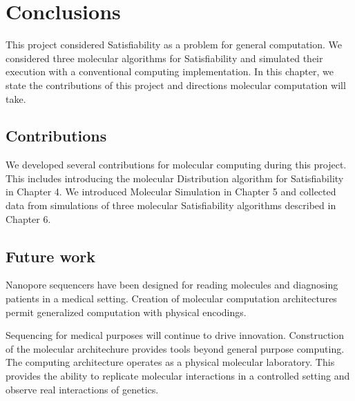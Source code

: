 \chapter{Conclusions}

This project considered {\sc Satisfiability} as a problem for general computation.  We considered three molecular algorithms for {\sc Satisfiability} and simulated their execution with a conventional computing implementation.  In this chapter, we state the contributions of this project and directions molecular computation will take.
	
	\section{Contributions}

We developed several contributions for molecular computing during this project.  This includes introducing the molecular Distribution algorithm for {\sc Satisfiability} in Chapter 4.  We introduced Molecular Simulation in Chapter 5 and collected data from simulations of three molecular {\sc Satisfiability} algorithms described in Chapter 6.  


	\section{Future work}
	
Nanopore sequencers have been designed for reading molecules and diagnosing patients in a medical setting.  Creation of molecular computation architectures permit generalized computation with physical encodings.  

Sequencing for medical purposes will continue to drive innovation. Construction of the molecular architechure provides tools beyond general purpose computing. The computing architecture operates as a physical molecular laboratory.  This provides the ability to replicate molecular interactions in a controlled setting and observe real interactions of genetics.
		
